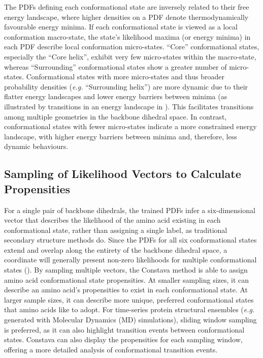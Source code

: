 The PDFs defining each conformational state are inversely related to their free energy landscape, where higher densities on a PDF denote thermodynamically favourable energy minima. If each conformational state is viewed as a local conformation macro-state, the state's likelihood maxima (or energy minima) in each PDF describe local conformation micro-states. ``Core'' conformational states, especially the ``Core helix'', exhibit very few micro-states within the macro-state, whereas ``Surrounding'' conformational states show a greater number of micro-states. Conformational states with more micro-states and thus broader probability densities (\textit{e.g.} ``Surrounding helix'') are more dynamic due to their flatter energy landscapes and lower energy barriers between minima (as illustrated by transitions in an energy landscape in ). This facilitates transitions among multiple geometries in the backbone dihedral space. In contrast, conformational states with fewer micro-states indicate a more constrained energy landscape, with higher energy barriers between minima and, therefore, less dynamic behaviours. 


\subsection{Sampling of Likelihood Vectors to Calculate Propensities}

For a single pair of backbone dihedrals, the trained PDFs infer a six-dimensional vector that describes the likelihood of the amino acid existing in each conformational state, rather than assigning a single label, as traditional secondary structure methods do. Since the PDFs for all six conformational states extend and overlap along the entirety of the backbone dihedral space, a coordinate will generally present non-zero likelihoods for multiple conformational states (). By sampling multiple vectors, the Constava method is able to assign amino acid conformational state propensities. At smaller sampling sizes, it can describe an amino acid's propensities to exist in each conformational state. At larger sample sizes, it can describe more unique, preferred conformational states that amino acids like to adopt. For time-series protein structural ensembles (\textit{e.g.} generated with Molecular Dynamics (MD) simulations), sliding window sampling is preferred, as it can also highlight transition events between conformational states. Constava can also display the propensities for each sampling window, offering a more detailed analysis of conformational transition events. 

